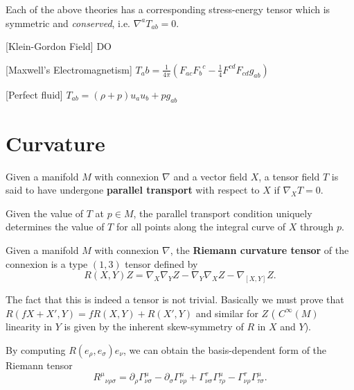 \documentclass[12pt]{article}
\begin{document}
\begin{example}
	Each of the above theories has a corresponding stress-energy tensor which is symmetric and \textit{conserved}, i.e. $\nabla^a T_{ab} = 0$.
		\begin{ronumerate}
			\item {[Klein-Gordon Field]} DO
			\item {[Maxwell's Electromagnetism]} $T_ab = \frac{1}{4 \pi}\left( F_{ac} {F_b}^c- \frac{1}{4}F^{cd}F_{cd} g_{ab} \right)$
			\item {[Perfect fluid]} $T_{ab} = (\rho + p) u_a u_b + pg_{ab}$
		\end{ronumerate}
\end{example}

\section{Curvature}

\begin{definition}
	Given a manifold $M$ with connexion $\nabla$ and a vector field $X$, a tensor field $T$ is said to have undergone \textbf{parallel transport} with respect to $X$ if $\nabla_X T = 0$.
\end{definition}
\begin{remark}
	Given the value of $T$ at $p \in M$, the parallel transport condition uniquely determines the value of $T$ for all points along the integral curve of $X$ through $p$.
\end{remark}

\begin{definition}
	Given a manifold $M$ with connexion $\nabla$, the \textbf{Riemann curvature tensor} of the connexion is a type $(1,3)$ tensor defined by
		\begin{equation}
			R(X,Y)Z = \nabla_X \nabla_Y Z - \nabla_Y \nabla_X Z - \nabla_{[X,Y]} Z.
		\end{equation}
\end{definition}
\begin{remark}
	The fact that this is indeed a tensor is not trivial. Basically we must prove that $R(fX + X', Y) = fR(X,Y) + R(X',Y)$ and similar for $Z$ ( $C^\infty(M)$ linearity in $Y$ is given by the inherent skew-symmetry of $R$ in $X$ and $Y$).
\end{remark}

\begin{noteEquation}
	By computing $R(e_\rho, e_\sigma) e_\nu$, we can obtain the basis-dependent form of the Riemann tensor
		\begin{equation}
			{R^\mu}_{\nu \rho \sigma} = \partial_\rho \Gamma^\mu_{\nu\sigma}
 - \partial_\sigma \Gamma^\mu_{\nu\rho} + \Gamma^\tau_{\nu\sigma}\Gamma^\mu_{\tau\rho} - \Gamma^\tau_{\nu\rho}\Gamma^\mu_{\tau\sigma}.
 		\end{equation}
\end{noteEquation}
\end{document}

